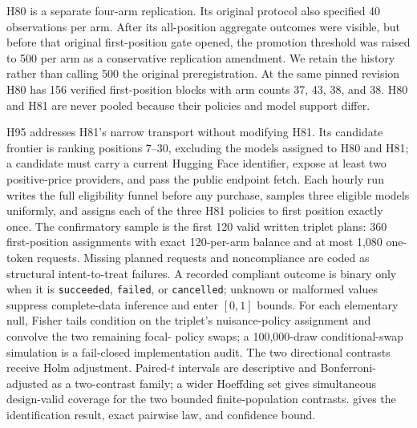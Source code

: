 \documentclass[11pt]{article}
\newcommand{\1}{\mathbf{1}}
\begin{document}
H80 is a separate four-arm replication.  Its original protocol also specified
40 observations per arm.  After its all-position aggregate outcomes were visible,
but before that original first-position gate opened, the promotion threshold was
raised to 500 per arm as a conservative replication amendment.  We retain the
history rather than calling 500 the original preregistration.  At the same pinned
revision H80 has 156 verified first-position blocks with arm counts 37, 43, 38,
and 38.  H80 and H81 are never pooled because their policies and model support
differ.

H95 addresses H81's narrow transport without modifying H81.  Its candidate
frontier is ranking positions 7--30, excluding the models assigned to H80 and
H81; a candidate must carry a current Hugging Face identifier, expose at least
two positive-price providers, and pass the public endpoint fetch.  Each hourly
run writes the full eligibility funnel before any purchase, samples three
eligible models uniformly, and assigns each of the three H81 policies to first
position exactly once.  The confirmatory sample is the first 120 valid written
triplet plans: 360 first-position assignments with exact 120-per-arm balance and
at most 1,080 one-token requests.  Missing planned requests and noncompliance are
coded as structural intent-to-treat failures.  A recorded compliant outcome is
binary only when it is \texttt{succeeded}, \texttt{failed}, or
\texttt{cancelled}; unknown or malformed values suppress complete-data inference
and enter $[0,1]$ bounds.  For each elementary null, Fisher tails condition on
the triplet's nuisance-policy assignment and convolve the two remaining focal-
policy swaps; a 100,000-draw conditional-swap simulation is a fail-closed
implementation audit.  The two directional contrasts receive Holm adjustment.
Paired-$t$ intervals are descriptive and Bonferroni-adjusted as a two-contrast
family; a wider Hoeffding set gives simultaneous design-valid coverage for the
two bounded finite-population contrasts.   gives the
identification result, exact pairwise law, and confidence bound.
\end{document}
